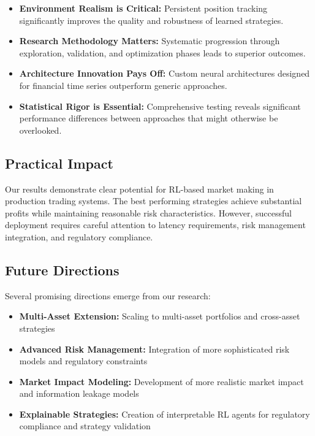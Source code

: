 \documentclass[conference]{IEEEtran}
\begin{document}
\begin{itemize}
\item \textbf{Environment Realism is Critical:} Persistent position tracking significantly improves the quality and robustness of learned strategies.

\item \textbf{Research Methodology Matters:} Systematic progression through exploration, validation, and optimization phases leads to superior outcomes.

\item \textbf{Architecture Innovation Pays Off:} Custom neural architectures designed for financial time series outperform generic approaches.

\item \textbf{Statistical Rigor is Essential:} Comprehensive testing reveals significant performance differences between approaches that might otherwise be overlooked.
\end{itemize}

\subsection{Practical Impact}

Our results demonstrate clear potential for RL-based market making in production trading systems. The best performing strategies achieve substantial profits while maintaining reasonable risk characteristics. However, successful deployment requires careful attention to latency requirements, risk management integration, and regulatory compliance.

\subsection{Future Directions}

Several promising directions emerge from our research:

\begin{itemize}
\item \textbf{Multi-Asset Extension:} Scaling to multi-asset portfolios and cross-asset strategies
\item \textbf{Advanced Risk Management:} Integration of more sophisticated risk models and regulatory constraints
\item \textbf{Market Impact Modeling:} Development of more realistic market impact and information leakage models
\item \textbf{Explainable Strategies:} Creation of interpretable RL agents for regulatory compliance and strategy validation
\end{itemize}
\end{document}
